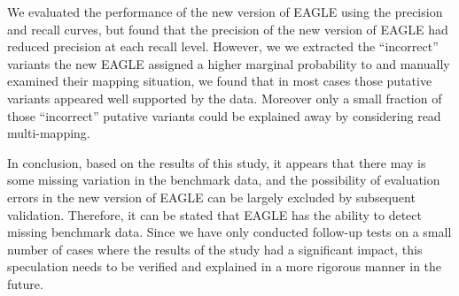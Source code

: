 \documentclass[PhD]{PHlab-thesis}
\begin{document}
{We evaluated the performance of the new version of EAGLE using the precision and recall curves, but found that the precision of the new version of EAGLE had reduced precision at each recall level.  However, we we extracted the ``incorrect'' variants the new EAGLE assigned a higher marginal probability to and manually examined their mapping situation, we found that in most cases those putative variants appeared well supported by the data.  Moreover only a small fraction of those ``incorrect'' putative variants could be explained away by considering read multi-mapping.

In conclusion, based on the results of this study, it appears that there may is some missing variation in the benchmark data, and the possibility of evaluation errors in the new version of EAGLE can be largely excluded by subsequent validation. Therefore, it can be stated that EAGLE has the ability to detect missing benchmark data. Since we have only conducted follow-up tests on a small number of cases where the results of the study had a significant impact, this speculation needs to be verified and explained in a more rigorous manner in the future.
}
\end{document}
